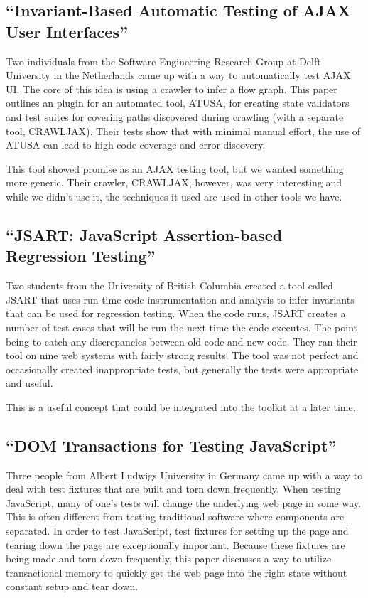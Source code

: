 \documentclass[12pt]{ucthesis}
\begin{document}
\subsection{``Invariant-Based Automatic Testing of AJAX User Interfaces''}
Two individuals from the Software Engineering Research Group at Delft University in the Netherlands came up with a way to automatically test AJAX UI\cite{InvariantBasedUseInterfaces}. The core of this idea is using a crawler to infer a flow graph. This paper outlines an plugin for an automated tool, ATUSA, for creating state validators and test suites for covering paths discovered during crawling (with a separate tool, CRAWLJAX). Their tests show that with minimal manual effort, the use of ATUSA can lead to high code coverage and error discovery. 

This tool showed promise as an AJAX testing tool, but we wanted something more generic. Their crawler, CRAWLJAX, however, was very interesting and while we didn't use it, the techniques it used are used in other tools we have.

\subsection{``JSART: JavaScript Assertion-based Regression Testing''}
Two students from the University of British Columbia created a tool called JSART that uses run-time code instrumentation and analysis to infer invariants that can be used for regression testing\cite{JSART}. When the code runs, JSART creates a number of test cases that will be run the next time the code executes. The point being to catch any discrepancies between old code and new code. They ran their tool on nine web systems with fairly strong results. The tool was not perfect and occasionally created inappropriate tests, but generally the tests were appropriate and useful.

This is a useful concept that could be integrated into the toolkit at a later time.

\subsection{``DOM Transactions for Testing JavaScript''}
Three people from Albert Ludwigs University in Germany came up with a way to deal with test fixtures that are built and torn down frequently\cite{DOMTransactions}. When testing JavaScript, many of one's tests will change the underlying web page in some way. This is often different from testing traditional software where components are separated. In order to test JavaScript, test fixtures for setting up the page and tearing down the page are exceptionally important. Because these fixtures are being made and torn down frequently, this paper discusses a way to utilize transactional memory to quickly get the web page into the right state without constant setup and tear down.
\end{document}
